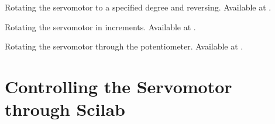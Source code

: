 \begin{ardcode}
   {Rotating 
    the servomotor to a specified degree and reversing.  Available at
    .}
  \label{ard:servo-reverse}
  
\end{ardcode}

\begin{ardcode}
   {Rotating the
    servomotor in increments.  Available at
    .}
  \label{ard:servo-loop}
  
\end{ardcode}

\begin{ardcode}
  {Rotating the servomotor through the potentiometer.  Available at
    .}
  \label{ard:servo-pot}
  
\end{ardcode}

\section{Controlling the Servomotor through Scilab}
